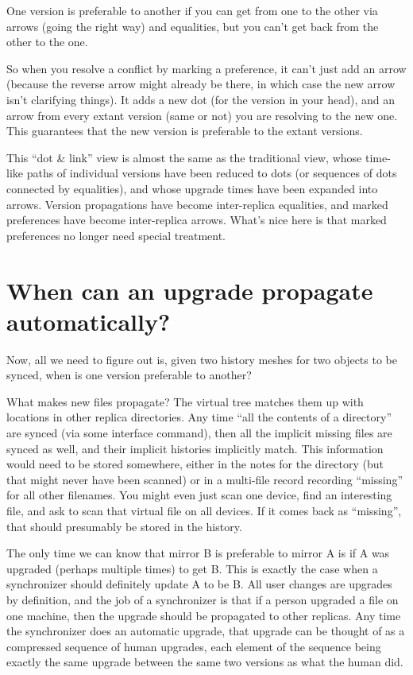 \documentclass{book}
\begin{document}
One version is preferable to another if you can get from one to the other via arrows (going the right way) and equalities, but you can't get back from the other to the one.

So when you resolve a conflict by marking a preference, it can't just add an arrow (because the reverse arrow might already be there, in which case the new arrow isn't clarifying things).  It adds a new dot (for the version in your head), and an arrow from every extant version (same or not) you are resolving to the new one.  This guarantees that the new version is preferable to the extant versions.

This ``dot \& link'' view is almost the same as the traditional view, whose time-like paths of individual versions have been reduced to dots (or sequences of dots connected by equalities), and whose upgrade times have been expanded into arrows.  Version propagations have become inter-replica equalities, and marked preferences have become inter-replica arrows.  What's nice here is that marked preferences no longer need special treatment.

\section{When can an upgrade propagate automatically?}

Now, all we need to figure out is, given two history meshes for two objects to be synced, when is one version preferable to another?

What makes new files propagate?  The virtual tree matches them up with locations in other replica directories.  Any time ``all the contents of a directory'' are synced (via some interface command), then all the implicit missing files are synced as well, and their implicit histories implicitly match.  This information would need to be stored somewhere, either in the notes for the directory (but that might never have been scanned) or in a multi-file record recording ``missing'' for all other filenames.  You might even just scan one device, find an interesting file, and ask to scan that virtual file on all devices.  If it comes back as ``missing'', that should presumably be stored in the history.

The only time we can know that mirror B is preferable to mirror A is if A was upgraded (perhaps multiple times) to get B.  This is exactly the case when a synchronizer should definitely update A to be B.  All user changes are upgrades by definition, and the job of a synchronizer is that if a person upgraded a file on one machine, then the upgrade should be propagated to other replicas.  Any time the synchronizer does an automatic upgrade, that upgrade can be thought of as a compressed sequence of human upgrades, each element of the sequence being exactly the same upgrade between the same two versions as what the human did.
\end{document}
